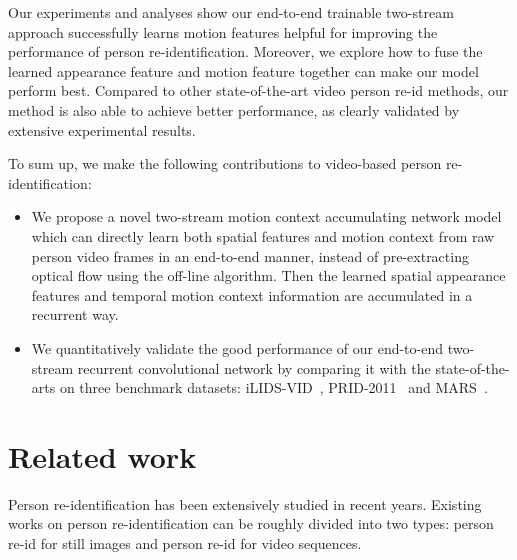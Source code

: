 \documentclass[journal]{IEEEtran}
\begin{document}
Our experiments and analyses show our end-to-end trainable two-stream approach successfully learns motion features helpful for improving the performance of person re-identification. Moreover, we explore how to fuse the learned appearance feature and motion feature together can make our model perform best. Compared to other state-of-the-art video person re-id methods, our method is also able to achieve  better performance, as clearly validated by extensive experimental results. 

To sum up, we make the following contributions to video-based person re-identification:

\begin{itemize} 

\item We propose a novel two-stream motion context accumulating network model which can directly learn both spatial features and motion context from raw person video frames in an end-to-end manner, instead of pre-extracting optical flow using the off-line algorithm. Then the learned spatial appearance features and temporal motion context information are accumulated in a recurrent way.

\item We quantitatively validate the good performance of our end-to-end two-stream recurrent convolutional network by comparing it with the state-of-the-arts on three benchmark datasets: iLIDS-VID~\cite{wang2014person}, PRID-2011~\cite{hirzer2011person} and MARS~\cite{zheng2016mars}.
\end{itemize}

\section {Related work}
Person re-identification has been extensively studied in recent years. Existing works on person re-identification can be roughly divided into two types: person re-id for still images and  person re-id for video sequences.
\end{document}
